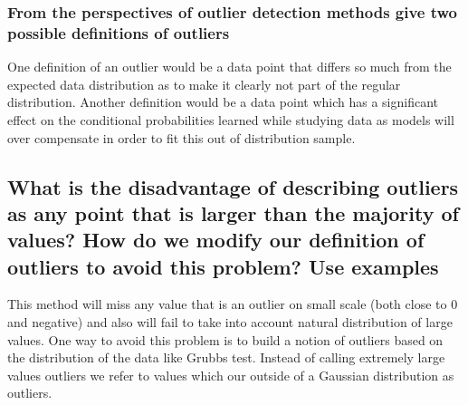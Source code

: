 \documentclass[11pt]{article}
\begin{document}
\subsubsection{From the perspectives of outlier detection methods give two possible definitions of outliers}
One definition of an outlier would be a data point that differs so much from the expected data distribution as to make it clearly not part of the regular distribution. Another definition would be a data point which has a significant effect on the conditional probabilities learned while studying data as models will over compensate in order to fit this out of distribution sample. 
\subsection{What is the disadvantage of describing outliers as any point that is larger than the majority of values? How do we modify our definition of outliers to avoid this problem? Use examples }
This method will miss any value that is an outlier on small scale (both close to 0 and negative) and also will fail to take into account natural distribution of large values. One way to avoid this problem is to build a notion of outliers based on the distribution of the data like Grubbs test. Instead of calling extremely large values outliers we refer to values which our outside of a Gaussian distribution as outliers. 
\end{document}
